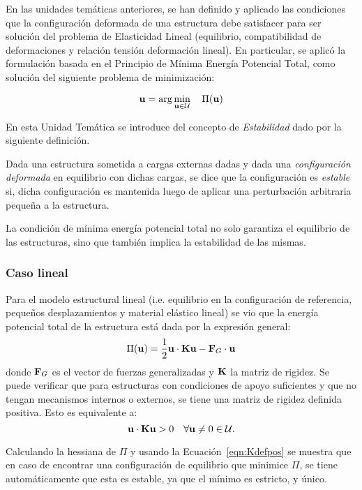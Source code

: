 En las unidades temáticas anteriores, se han definido y aplicado las condiciones que la configuración deformada de una estructura debe satisfacer para ser solución del problema de Elasticidad Lineal (equilibrio, compatibilidad de deformaciones y relación tensión deformación lineal). En particular, se aplicó la formulación basada en el Principio de Mínima Energía Potencial Total, como solución del siguiente problema de minimización:

\begin{equation}\label{eqn:minPi}
{\bf u} = \arg\min_{{\bf u}\in{\mathcal U}} \quad  \Pi({\bf u})
\end{equation}

En esta Unidad Temática se introduce del concepto de \textit{Estabilidad} dado por la siguiente definición.

{Dada una estructura sometida a cargas externas dadas y dada una \textit{configuración deformada} en equilibrio con dichas cargas, se dice que la configuración es \textit{estable} si, dicha configuración es mantenida luego de aplicar una perturbación arbitraria pequeña a la estructura.}

La condición de mínima energía potencial total no solo garantiza el equilibrio de las estructuras, sino que también implica la estabilidad de las mismas.

\subsubsection{Caso lineal}

Para el modelo estructural lineal (i.e. equilibrio en la configuración de referencia, pequeños desplazamientos y material elástico lineal) se vio que la energía potencial total de la estructura está dada por la expresión general:
%
\begin{equation}\label{eqn:pilineal}
\Pi({\bf u})= \frac{1}{2} {\bf u} \cdot {\bf K} {\bf u} - {\bf F}_G \cdot {\bf u}
\end{equation}
%
donde ${\bf F}_G$ es el vector de fuerzas generalizadas y ${\bf K}$ la matriz de rigidez. %
Se puede verificar que para estructuras con condiciones de apoyo suficientes y que no tengan mecanismos internos o externos, se tiene una matriz de rigidez definida positiva. Esto es equivalente a:
\begin{equation}\label{eqn:Kdefpos}
{\bf u} \cdot {\bf K} {\bf u} > 0 \quad \forall {\bf u}\neq 0 \in {\mathcal U}.
\end{equation}

Calculando la hessiana de $\Pi$ y usando la Ecuación~\ref{eqn:Kdefpos} se muestra que en caso de encontrar una configuración de equilibrio que minimice $\Pi$, se tiene automáticamente que esta es estable, ya que el mínimo es estricto, y único.  


